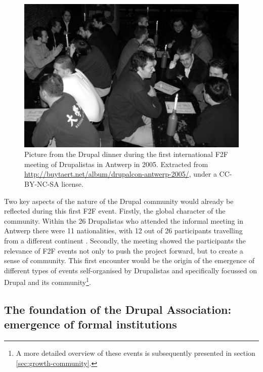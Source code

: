 \begin{figure}[H]
	\centering
	\includegraphics[scale=0.4]{img/events/drupalcon-antwerp-2005}
	\caption[First Drupal international meetup]%
    {Picture from the Drupal dinner during the first international F2F meeting of Drupalistas in Antwerp in 2005. Extracted from \url{http://buytaert.net/album/drupalcon-antwerp-2005/}, under a CC-BY-NC-SA license.}
	\label{drupal-first-sprint}
\end{figure}

Two key aspects of the nature of the Drupal community would already be reflected during this first F2F event. Firstly, the global character of the community. Within the 26 Drupalistas who attended the informal meeting in Antwerp there were 11 nationalities, with 12 out of 26 participants travelling from a different continent \parencite{benjamin2011definitive}.
Secondly, the meeting showed the participants the relevance of F2F events not only to push the project forward, but to create a sense of community. This first encounter would be the origin of the emergence of different types of events self-organised by Drupalistas and specifically focussed on Drupal and its community\footnote{A more detailed overview of these events is subsequently presented in section \ref{sec:growth-community}.}. 
 
\subsection{The foundation of the Drupal Association: emergence of formal institutions}
\label{subsec:foundation-da}


